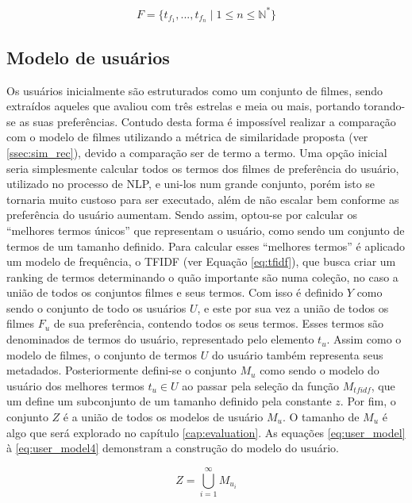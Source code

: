 \begin{equation}
	F = \{t_{f_1}, ..., t_{f_n} \; | \; 1 \leq n \leq \mathbb{N}^*\}
\label{eq:film_model2}
\end{equation}

\subsection{Modelo de usuários}
\label{ssec:user_model}

Os usuários inicialmente são estruturados como um conjunto de filmes, sendo extraídos aqueles que avaliou com três estrelas e meia ou mais, portando torando-se as suas preferências. Contudo desta forma é impossível realizar a comparação com o modelo de filmes utilizando a métrica de similaridade proposta (ver \ref{ssec:sim_rec}), devido a comparação ser de termo a termo. Uma opção inicial seria simplesmente calcular todos os termos dos filmes de preferência do usuário, utilizado no processo de \ac{NLP}, e uni-los num grande conjunto, porém isto se tornaria muito custoso para ser executado, além de não escalar bem conforme as preferência do usuário aumentam. Sendo assim, optou-se por calcular os \enquote{melhores termos únicos} que representam o usuário, como sendo um conjunto de termos de um tamanho definido. Para calcular esses \enquote{melhores termos} é aplicado um modelo de frequência, o \ac{TFIDF} (ver Equação \ref{eq:tfidf}), que busca criar um ranking de termos determinando o quão importante são numa coleção, no caso a união de todos os conjuntos filmes e seus termos. Com isso é definido $Y$ como sendo o conjunto de todo os usuários $U$, e este por sua vez a união de todos os filmes $F_u$ de sua preferência, contendo todos os seus termos. Esses termos são denominados de termos do usuário, representado pelo elemento $t_u$. Assim como o modelo de filmes, o conjunto de termos $U$ do usuário também representa seus metadados. Posteriormente defini-se o conjunto $M_u$ como sendo o modelo do usuário dos melhores termos $t_u \in U$ ao passar pela seleção da função $M_{tfidf}$, que um define um subconjunto de um tamanho definido pela constante $z$. Por fim, o conjunto $Z$ é a união de todos os modelos de usuário $M_u$. O tamanho de $M_u$ é algo que será explorado no capítulo \ref{cap:evaluation}. As equações \ref{eq:user_model} à \ref{eq:user_model4} demonstram a construção do modelo do usuário.

\begin{equation}
	Z = \bigcup\limits_{i=1}^{\infty} M_{u_i}
\label{eq:user_model}
\end{equation}

